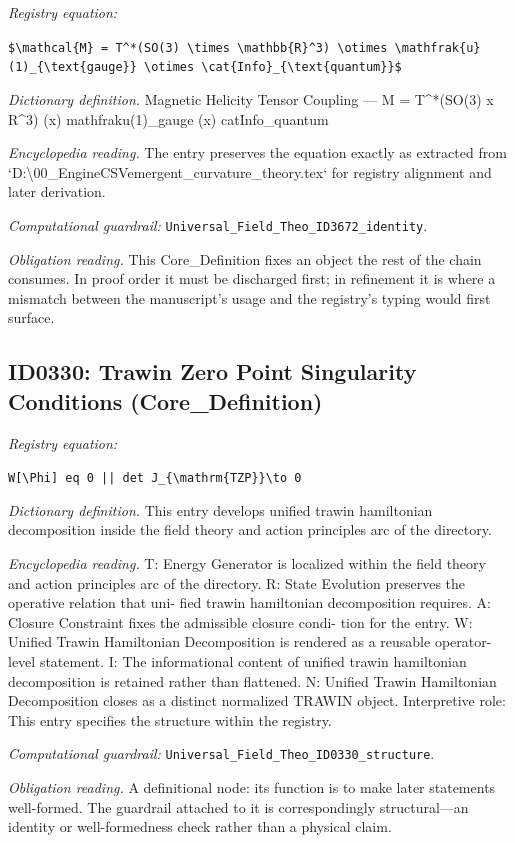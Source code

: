 \documentclass[11pt]{article}
\theoremstyle{remark}
\begin{document}
\noindent\textit{Registry equation:}\par
{\small\texttt{\$\textbackslash{}mathcal\{M\} = T\textasciicircum{}*(SO(3) \textbackslash{}times \textbackslash{}mathbb\{R\}\textasciicircum{}3) \textbackslash{}otimes \textbackslash{}mathfrak\{u\}(1)\_\{\textbackslash{}text\{gauge\}\} \textbackslash{}otimes \textbackslash{}cat\{Info\}\_\{\textbackslash{}text\{quantum\}\}\$}}\par\medskip
\noindent\textit{Dictionary definition.} Magnetic Helicity Tensor Coupling --- M = T\textasciicircum{}*(SO(3) x R\textasciicircum{}3) (x) mathfraku(1)\_gauge (x) catInfo\_quantum\par\medskip
\noindent\textit{Encyclopedia reading.} The entry preserves the equation exactly as extracted from `D:\textbackslash{}00\_EngineCSVemergent\_curvature\_theory.tex` for registry alignment and later derivation.
\par\medskip\noindent\textit{Computational guardrail:} \texttt{Universal\_Field\_Theo\_ID3672\_identity}.
\par\medskip\noindent\textit{Obligation reading.} This Core\_Definition fixes an object the rest of the chain consumes. In proof order it must be discharged first; in refinement it is where a mismatch between the manuscript's usage and the registry's typing would first surface.

\subsection{ID0330: Trawin Zero Point Singularity Conditions (Core\_Definition)}

\noindent\textit{Registry equation:}\par
{\small\texttt{W[\textbackslash{}Phi] eq 0 || det J\_\{\textbackslash{}mathrm\{TZP\}\}\textbackslash{}to 0}}\par\medskip
\noindent\textit{Dictionary definition.} This entry develops unified trawin hamiltonian decomposition inside the field theory and action principles arc of the directory.\par\medskip
\noindent\textit{Encyclopedia reading.} T: Energy Generator is localized within the field theory and action principles arc of the directory. R: State Evolution preserves the operative relation that uni- fied trawin hamiltonian decomposition requires. A: Closure Constraint fixes the admissible closure condi- tion for the entry. W: Unified Trawin Hamiltonian Decomposition is rendered as a reusable operator-level statement. I: The informational content of unified trawin hamiltonian decomposition is retained rather than flattened. N: Unified Trawin Hamiltonian Decomposition closes as a distinct normalized TRAWIN object. Interpretive role: This entry specifies the structure within the registry.
\par\medskip\noindent\textit{Computational guardrail:} \texttt{Universal\_Field\_Theo\_ID0330\_structure}.
\par\medskip\noindent\textit{Obligation reading.} A definitional node: its function is to make later statements well-formed. The guardrail attached to it is correspondingly structural---an identity or well-formedness check rather than a physical claim.
\end{document}
